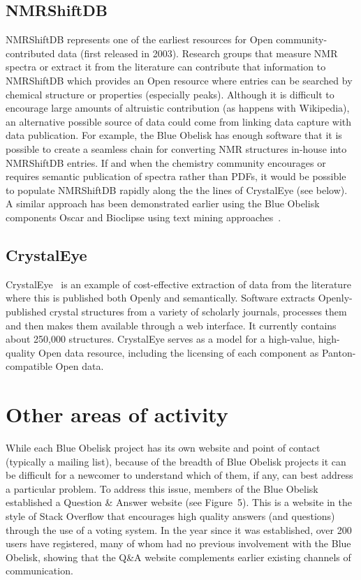 \documentclass[10pt]{bmc_article}
\newenvironment{bmcformat}{\begin{raggedright}\baselineskip20pt\sloppy\setboolean{publ}{false}}{\end{raggedright}\baselineskip20pt\sloppy}
\begin{document}
\begin{bmcformat}
\subsection*{NMRShiftDB}

NMRShiftDB \cite{nmrshiftdb, Steinbeck2004} represents one of the earliest resources for Open
community-contributed data (first released in 2003). Research groups that 
measure NMR spectra or extract it from the literature can contribute that
information to
NMRShiftDB which provides an Open resource where
entries can be searched by chemical structure or properties
(especially peaks). Although it is difficult to
encourage large amounts of altruistic contribution (as happens with
Wikipedia), an alternative possible source of data could come from
linking
data capture with data publication. For example, the Blue Obelisk has
enough software that it is possible to create
a seamless chain for converting NMR structures in-house into
NMRShiftDB entries. If and when the chemistry community
encourages or requires semantic publication of spectra rather than
PDFs, it would be possible to populate NMRShiftDB rapidly
along the the lines of CrystalEye (see below). A similar approach
has been demonstrated earlier using the Blue Obelisk components
Oscar and Bioclipse using text mining approaches~\cite{NMRExtraction}.

\subsection*{CrystalEye}

CrystalEye~\cite{WebCrystalEye} is an example of cost-effective extraction of data from the
literature where this is published both
Openly and semantically. Software extracts Openly-published crystal
structures from a variety of scholarly journals, processes
them and then makes them available through a web interface.
It currently contains about 250,000 structures. CrystalEye serves as a model
for a high-value, high-quality Open data
resource, including the licensing of each component as
Panton-compatible Open data.

\section*{Other areas of activity}

While each Blue Obelisk project has its own website and point of
contact (typically a mailing list), because of the breadth of Blue Obelisk
projects it can be difficult for a newcomer to understand which of
them, if any, can best address a particular problem. To address this
issue, members of the Blue Obelisk established a Question \& Answer
website\cite{WebBOShapado} (see Figure~5).  This is a website in the
style of Stack Overflow\cite{WebStackOverflow} that encourages high quality answers (and
questions) through the use of a voting system. In the year since it
was established, over 200 users have registered, many of whom had no
previous involvement with the Blue Obelisk, showing that the Q\&A
website complements earlier existing channels of communication.


\end{bmcformat}
\end{document}
